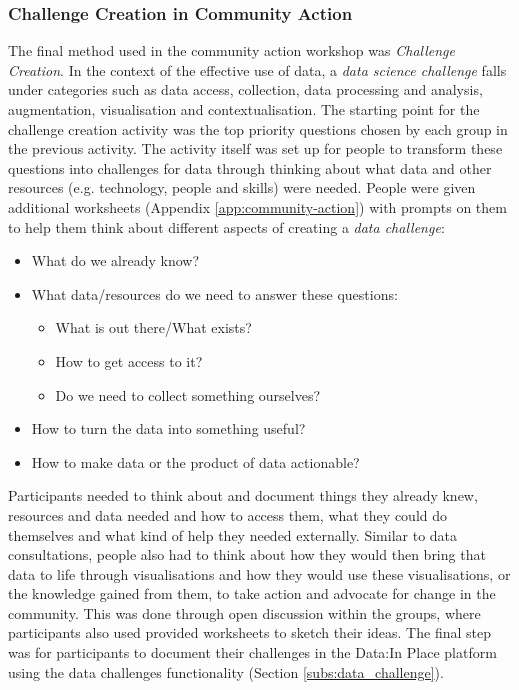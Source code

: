 \subsubsection{Challenge Creation in Community Action}
The final method used in the community action workshop was \textit{Challenge Creation}. In the context of the effective use of data, a \textit{data science challenge} falls under categories such as data access, collection, data processing and analysis, augmentation, visualisation and contextualisation. The starting point for the challenge creation activity was the top priority questions chosen by each group in the previous activity. The activity itself was set up for people to transform these questions into challenges for data through thinking about what data and other resources (e.g. technology, people and skills) were needed. People were given additional worksheets (Appendix \ref{app:community-action}) with prompts on them to help them think about different aspects of creating a \textit{data challenge}:
\begin{itemize}
    \item What do we already know?
    \item What data/resources do we need to answer these questions:
    \begin{itemize}
        \item What is out there/What exists?
        \item How to get access to it?
        \item Do we need to collect something ourselves?
    \end{itemize}
    \item How to turn the data into something useful?
    \item How to make data or the product of data actionable?
\end{itemize}

Participants needed to think about and document things they already knew, resources and data needed and how to access them, what they could do themselves and what kind of help they needed externally. Similar to data consultations, people also had to think about how they would then bring that data to life through visualisations and how they would use these visualisations, or the knowledge gained from them, to take action and advocate for change in the community. This was done through open discussion within the groups, where participants also used provided worksheets to sketch their ideas. The final step was for participants to document their challenges in the Data:In Place platform using the data challenges functionality (Section \ref{subs:data_challenge}).
 
